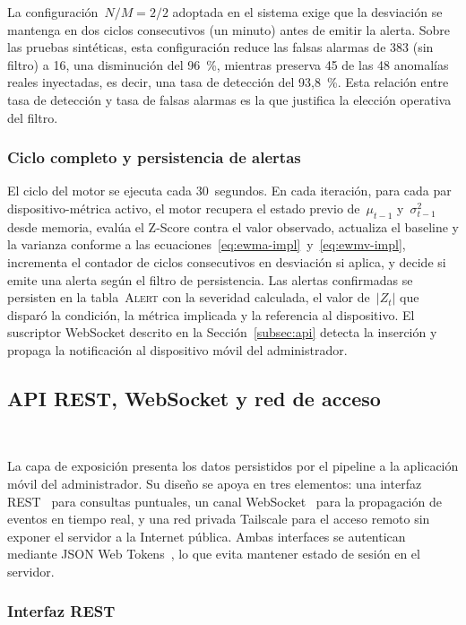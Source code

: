 La configuración~\(N/M = 2/2\) adoptada en el sistema exige que la 
desviación se mantenga en dos ciclos consecutivos (un minuto) antes 
de emitir la alerta. Sobre las pruebas sintéticas, esta 
configuración reduce las falsas alarmas de 383 (sin filtro) a 16, 
una disminución del 96~\%, mientras preserva 45 de las 48 anomalías 
reales inyectadas, es decir, una tasa de detección del 93{,}8~\%. 
Esta relación entre tasa de detección y tasa de falsas alarmas es la 
que justifica la elección operativa del filtro.

\subsubsection{Ciclo completo y persistencia de alertas}

El ciclo del motor se ejecuta cada 30~segundos. En cada iteración, 
para cada par dispositivo-métrica activo, el motor recupera el 
estado previo de~\(\mu_{t-1}\) y~\(\sigma^2_{t-1}\) desde memoria, 
evalúa el Z-Score contra el valor observado, actualiza el baseline 
y la varianza conforme a las ecuaciones~\eqref{eq:ewma-impl}~y~\eqref{eq:ewmv-impl}, 
incrementa el contador de ciclos consecutivos en desviación si 
aplica, y decide si emite una alerta según el filtro de persistencia. 
Las alertas confirmadas se persisten en la tabla~\textsc{Alert} 
con la severidad calculada, el valor de~\(|Z_t|\) que disparó la 
condición, la métrica implicada y la referencia al dispositivo. El 
suscriptor WebSocket descrito en la Sección~\ref{subsec:api} 
detecta la inserción y propaga la notificación al dispositivo móvil 
del administrador.

\subsection{API REST, WebSocket y red de acceso}
~\label{subsec:api}

La capa de exposición presenta los datos persistidos por el 
pipeline a la aplicación móvil del administrador. Su diseño se 
apoya en tres elementos: una interfaz REST~\cite{fielding2000rest} 
para consultas puntuales, un canal WebSocket~\cite{rfc6455} para la 
propagación de eventos en tiempo real, y una red privada Tailscale 
para el acceso remoto sin exponer el servidor a la Internet 
pública. Ambas interfaces se autentican mediante JSON Web 
Tokens~\cite{rfc7519}, lo que evita mantener estado de sesión en 
el servidor.

\subsubsection{Interfaz REST}

